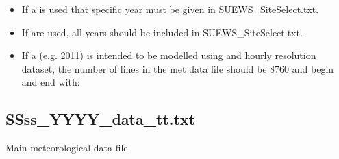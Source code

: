 \documentclass[letterpaper,10pt,english]{sphinxmanual}
\begin{document}
\begin{itemize}
\item {} 
If a  is used that specific year must be given in
SUEWS\_SiteSelect.txt.

\item {} 
If  are used, all years should be included in
SUEWS\_SiteSelect.txt.

\item {} 
If a  (e.g. 2011) is intended to be modelled using and
hourly resolution dataset, the number of lines in the met data file
should be 8760 and begin and end with:

\end{itemize}

\begin{DUlineblock}{0em}
\item[] 
\item[] 
\item[] 
\item[] 
\end{DUlineblock}


\subsection{SSss\_YYYY\_data\_tt.txt}
\label{\detokenize{input_files/met_input:ssss-yyyy-data-tt-txt}}
Main meteorological data file.
\end{document}
